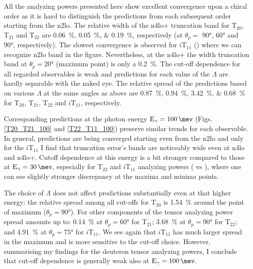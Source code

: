     All the analyzing powers presented here show excellent convergence 
    upon a chiral order as it is hard to distinguish the predictions
    from each subsequent order starting from the \gls{n2lo}.
    The relative width of the \gls{n4lo+} truncation band 
    for T$_{20}$, T$_{21}$ and T$_{22}$
    are \SIlist{0.06; 0.05; 0.19}{\percent}, respectively (at $\theta_p=$ \ang{90}, \ang{60} and \ang{90}, respectively).
    The slowest convergence is observed for $i\text{T}_{11}$ ()
    where we can recognize \gls{n2lo} band in the figure.
    Nevertheless, at the \gls{n4lo+}
    the width truncation band at $\theta_p = \ang{20}$ (maximum point)
    is only a \SI{0.2}{\percent}.
    The cut-off dependence for all regarded observables is weak and 
    predictions for each value of the $\Lambda$ are hardly separable 
    with the naked eye.
    The relative spread of the predictions based on various $\Lambda$ at the same angles as above 
    are \SIlist{0.87; 0.94; 3.42; 0.68}{\percent} for T$_{20}$, T$_{21}$, T$_{22}$ and $i\text{T}_{11}$, respectively.


    Corresponding predictions at the photon energy $\text{E}_\gamma = \SI{100}{\mev}$
    (Figs. \ref{T20_T21_100} and \ref{T22_T11_100}) preserve similar
    trends for each observable. 
    In general, predictions are being converged starting
    even from the \gls{n2lo} and only for the $i\text{T}_{11}$
    I find
    that truncation error's bands are noticeably wide
    even at \gls{n4lo} and \gls{n4lo+}.
    Cutoff dependence at this energy is a bit stronger
    compared to those at $\text{E}_\gamma = \SI{30}{\mev}$, especially
    for 
    $\text{T}_{22}$ and $i\text{T}_{11}$ analyzing powers ( vs ),
    where one can see 
    slightly stronger discrepancy at the maxima and minima points.
    
    The choice of $\Lambda$ does not affect predictions substantially
    even at that higher energy:
    the relative spread among all cut-offs for T$_{20}$ is \SI{1.54}{\percent}
    around the point of maximum ($\theta_p = \ang{90}$).
    For other components of the tensor analyzing power spread amounts up to:
    \SI{0.14}{\percent} at $\theta_p = \ang{60}$ for T$_{21}$;
    \SI{3.68}{\percent} at $\theta_p = \ang{90}$ for T$_{22}$;
    and \SI{4.91}{\percent} at $\theta_p = \ang{75}$ for $i\text{T}_{11}$.
    We see again that $i\text{T}_{11}$ has much larger spread in the maximum and
    is more sensitive to the cut-off choice.
    However, summarising my findings 
    for the deuteron tensor analyzing powers,
    I conclude that cut-off dependence is generally weak
    also at $\text{E}_\gamma = \SI{100}{\mev}$.


